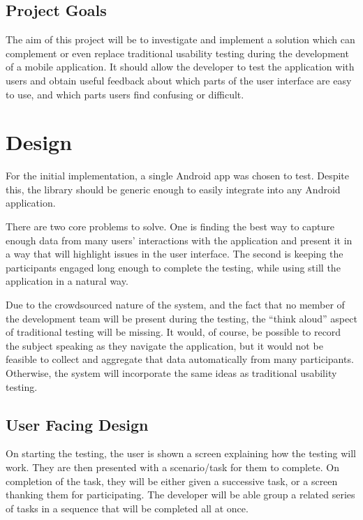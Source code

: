 \section{Project Goals}

The aim of this project will be to investigate and implement a solution which can complement or even replace traditional usability testing during the development of a mobile application. It should allow the developer to test the application with users and obtain useful feedback about which parts of the user interface are easy to use, and which parts users find confusing or difficult.

\chapter{Design}

For the initial implementation, a single Android app was chosen to test. Despite this, the library should be generic enough to easily integrate into any Android application.

There are two core problems to solve. One is finding the best way to capture enough data from many users' interactions with the application and present it in a way that will highlight issues in the user interface. The second is keeping the participants engaged long enough to complete the testing, while using still the application in a natural way.

Due to the crowdsourced nature of the system, and the fact that no member of the development team will be present during the testing, the ``think aloud'' aspect of traditional testing will be missing. It would, of course, be possible to record the subject speaking as they navigate the application, but it would not be feasible to collect and aggregate that data automatically from many participants. Otherwise, the system will incorporate the same ideas as traditional usability testing.

\section{User Facing Design}

On starting the testing, the user is shown a screen explaining how the testing will work. They are then presented with a scenario/task for them to complete. On completion of the task, they will be either given a successive task, or a screen thanking them for participating. The developer will be able group a related series of tasks in a sequence that will be completed all at once.

